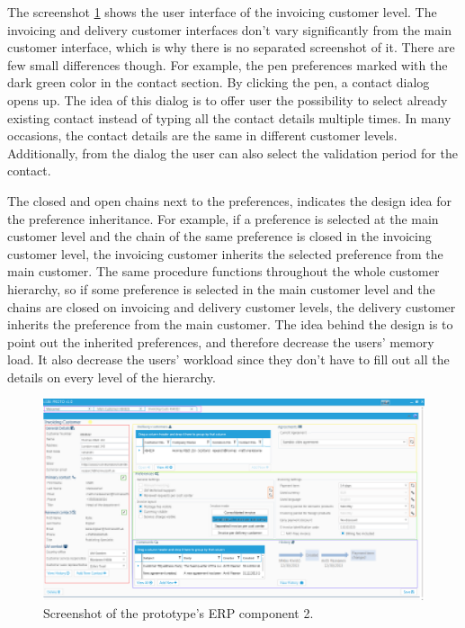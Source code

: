 \documentclass[12pt,a4paper,oneside,pdftex]{report}
\begin{document}
The screenshot \ref{fig:prototwoimg} shows the user interface of the invoicing customer level. The invoicing and delivery customer interfaces don't vary significantly from the main customer interface, which is why there is no separated screenshot of it. There are few small differences though. For example, the pen preferences marked with the dark green color in the contact section. By clicking the pen, a contact dialog opens up. The idea of this dialog is to offer user the possibility to select already existing contact instead of typing all the contact details multiple times. In many occasions, the contact details are the same in different customer levels. Additionally, from the dialog the user can also select the validation period for the contact. 

The closed and open chains next to the preferences, indicates the design idea for the preference inheritance. For example, if a preference is selected at the main customer level and the chain of the same preference is closed in the invoicing customer level, the invoicing customer inherits the selected preference from the main customer. The same procedure functions throughout the whole customer hierarchy, so if some preference is selected in the main customer level and the chains are closed on invoicing and delivery customer levels, the delivery customer inherits the preference from the main customer. The idea behind the design is to point out the inherited preferences, and therefore decrease the users' memory load. It also decrease the users' workload since they don't have to fill out all the details on every level of the hierarchy.   

\begin{figure}[H]
  	\centerline{
    	   \includegraphics[width=1.3\textwidth]{./images/proto_invoicing.png}
    	   }
  	   \caption{Screenshot of  the prototype's ERP component 2.}
	   \label{fig:prototwoimg}
\end{figure}
\end{document}
